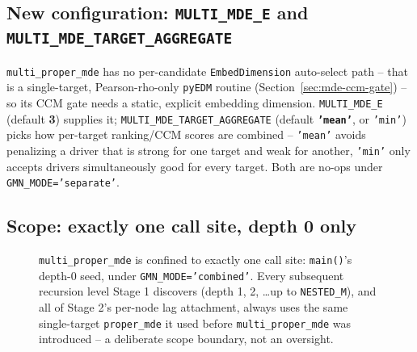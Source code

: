 \documentclass[11pt]{article}
\begin{document}
\subsection{New configuration: \texttt{MULTI\_MDE\_E} and \texttt{MULTI\_MDE\_TARGET\_AGGREGATE}}
\texttt{multi\_proper\_mde} has no per-candidate \texttt{EmbedDimension} auto-select path -- that is a single-target, Pearson-rho-only \texttt{pyEDM} routine (Section~\ref{sec:mde-ccm-gate}) -- so its CCM gate needs a static, explicit embedding dimension. \texttt{MULTI\_MDE\_E} (default \textbf{3}) supplies it; \texttt{MULTI\_MDE\_TARGET\_AGGREGATE} (default \textbf{\texttt{'mean'}}, or \texttt{'min'}) picks how per-target ranking/CCM scores are combined -- \texttt{'mean'} avoids penalizing a driver that is strong for one target and weak for another, \texttt{'min'} only accepts drivers simultaneously good for every target. Both are no-ops under \texttt{GMN\_MODE='separate'}.

\subsection{Scope: exactly one call site, depth 0 only}
\begin{figure}[H]
\centering
{}
\caption{\texttt{multi\_proper\_mde} is confined to exactly one call site: \texttt{main()}'s depth-0 seed, under \texttt{GMN\_MODE='combined'}. Every subsequent recursion level Stage 1 discovers (depth 1, 2, \ldots up to \texttt{NESTED\_M}), and all of Stage 2's per-node lag attachment, always uses the same single-target \texttt{proper\_mde} it used before \texttt{multi\_proper\_mde} was introduced -- a deliberate scope boundary, not an oversight.}
\label{fig:multi-mde-scope}
\end{figure}
\end{document}
